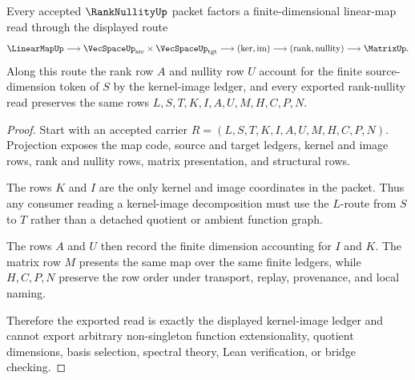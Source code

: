 \begin{theorem}
\label{thm:rank-nullity-kernel-image-ledger}
Every accepted $\RankNullityUp$ packet factors a finite-dimensional linear-map read through the displayed route
$$
\LinearMapUp \longrightarrow \VecSpaceUp_{\mathrm{src}} \times \VecSpaceUp_{\mathrm{tgt}} \longrightarrow (\ker,\operatorname{im}) \longrightarrow (\operatorname{rank},\operatorname{nullity}) \longrightarrow \MatrixUp .
$$
Along this route the rank row $A$ and nullity row $U$ account for the finite source-dimension token of $S$ by the kernel-image ledger, and every exported rank-nullity read preserves the same rows $L,S,T,K,I,A,U,M,H,C,P,N$.
\end{theorem}
\begin{proof}
Start with an accepted carrier $R=(L,S,T,K,I,A,U,M,H,C,P,N)$. Projection exposes the map code, source and target ledgers, kernel and image rows, rank and nullity rows, matrix presentation, and structural rows.

The rows $K$ and $I$ are the only kernel and image coordinates in the packet. Thus any consumer reading a kernel-image decomposition must use the $L$-route from $S$ to $T$ rather than a detached quotient or ambient function graph.

The rows $A$ and $U$ then record the finite dimension accounting for $I$ and $K$. The matrix row $M$ presents the same map over the same finite ledgers, while $H,C,P,N$ preserve the row order under transport, replay, provenance, and local naming.

Therefore the exported read is exactly the displayed kernel-image ledger and cannot export arbitrary non-singleton function extensionality, quotient dimensions, basis selection, spectral theory, Lean verification, or bridge checking.
\end{proof}

\begin{closurestatus}{\RankNullityUp}
  \theoryclosure{\seedClosure}
  \formalstatus{\unformalizedV}
\end{closurestatus}

